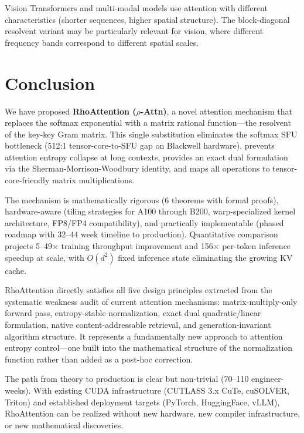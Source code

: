 \documentclass[11pt,a4paper]{article}
\theoremstyle{remark}
\begin{document}
Vision Transformers and multi-modal models use attention with different characteristics (shorter sequences, higher spatial structure). The block-diagonal resolvent variant may be particularly relevant for vision, where different frequency bands correspond to different spatial scales.

\section{Conclusion}

We have proposed \textbf{RhoAttention ($\rho$-Attn)}, a novel attention mechanism that replaces the softmax exponential with a matrix rational function---the resolvent of the key-key Gram matrix. This single substitution eliminates the softmax SFU bottleneck (512:1 tensor-core-to-SFU gap on Blackwell hardware), prevents attention entropy collapse at long contexts, provides an exact dual formulation via the Sherman-Morrison-Woodbury identity, and maps all operations to tensor-core-friendly matrix multiplications.

The mechanism is mathematically rigorous (6 theorems with formal proofs), hardware-aware (tiling strategies for A100 through B200, warp-specialized kernel architecture, FP8/FP4 compatibility), and practically implementable (phased roadmap with 32--44 week timeline to production). Quantitative comparison projects 5--49$\times$ training throughput improvement and 156$\times$ per-token inference speedup at scale, with $O(d^2)$ fixed inference state eliminating the growing KV cache.

RhoAttention directly satisfies all five design principles extracted from the systematic weakness audit of current attention mechanisms: matrix-multiply-only forward pass, entropy-stable normalization, exact dual quadratic/linear formulation, native content-addressable retrieval, and generation-invariant algorithm structure. It represents a fundamentally new approach to attention entropy control---one built into the mathematical structure of the normalization function rather than added as a post-hoc correction.

The path from theory to production is clear but non-trivial (70--110 engineer-weeks). With existing CUDA infrastructure (CUTLASS 3.x CuTe, cuSOLVER, Triton) and established deployment targets (PyTorch, HuggingFace, vLLM), RhoAttention can be realized without new hardware, new compiler infrastructure, or new mathematical discoveries.
\end{document}
